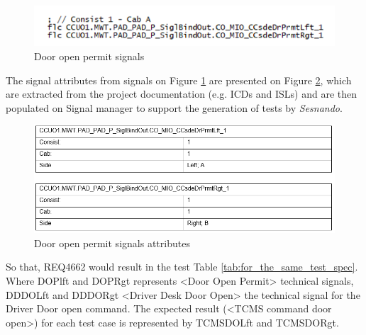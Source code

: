 \begin{figure}[H]
    \centering
    \includegraphics[width=\textwidth]{images/door_prmt.PNG}
    \caption{Door open permit signals}
    \label{fig:hier_elem_attr}
\end{figure}

The signal attributes from signals on Figure \ref{fig:hier_elem_attr} are presented on Figure \ref{fig:door_perm_sig_attr}, which are extracted from the project documentation (e.g. ICDs and ISLs) and are then populated on Signal manager to support the generation of tests by \textit{Sesnando}.

\begin{figure}[H]
    \centering
    \includegraphics[width=\textwidth]{images/signal_attr_dp.PNG}
    \caption{Door open permit signals attributes}
    \label{fig:door_perm_sig_attr}
\end{figure}


So that, REQ4662 would result in the test Table \ref{tab:for_the_same_test_spec}. Where DOPlft and DOPRgt represents <Door Open Permit> technical signals, DDDOLft and DDDORgt <Driver Desk Door Open> the technical signal for the Driver Door open command. The expected result (<TCMS command door open>) for each test case is represented by TCMSDOLft and TCMSDORgt.

